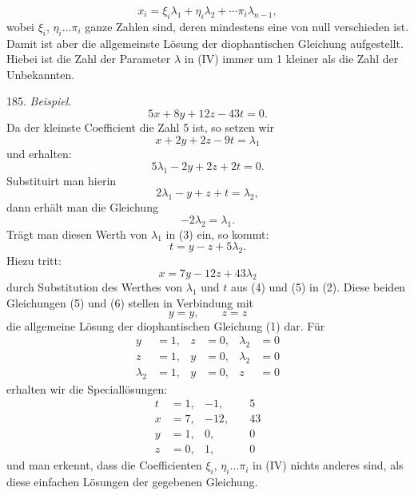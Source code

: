 \documentclass[11pt]{article}
\providecommand{\weberpage}[1]{}
\providecommand{\weq}[2]{\begin{equation}\tag{#1}#2\end{equation}}
\begin{document}
\weberpage{198}
\weq{IV}{x_i = \xi_i\lambda_1 + \eta_i\lambda_2 + \cdots \pi_i\lambda_{n-1},}
wobei $\xi_i$, $\eta_i \ldots \pi_i$ ganze Zahlen sind, deren mindestens eine von null verschieden ist. Damit ist aber die allgemeinste Lösung der diophantischen Gleichung aufgestellt. Hiebei ist die Zahl der Parameter $\lambda$ in (IV) immer um 1 kleiner als die Zahl der Unbekannten.

185. \textit{Beispiel.}
\weq{1}{5x+8y+12z-43t=0.}
Da der kleinste Coefficient die Zahl 5 ist, so setzen wir
\weq{2}{x+2y+2z-9t=\lambda_1}
und erhalten:
\[
5\lambda_1 - 2y + 2z + 2t = 0.
\]
Substituirt man hierin
\weq{3}{2\lambda_1-y+z+t=\lambda_2,}
dann erhält man die Gleichung
\weq{4}{-2\lambda_2=\lambda_1.}
Trägt man diesen Werth von $\lambda_1$ in (3) ein, so kommt:
\weq{5}{t=y-z+5\lambda_2.}
Hiezu tritt:
\weq{6}{x=7y-12z+43\lambda_2}
durch Substitution des Werthes von $\lambda_1$ und $t$ aus (4) und (5) in (2). Diese beiden Gleichungen (5) und (6) stellen in Verbindung mit
\[
y=y, \qquad z=z
\]
die allgemeine Lösung der diophantischen Gleichung (1) dar. Für
\[
\begin{aligned}
y&=1, & z&=0, & \lambda_2&=0\\
z&=1, & y&=0, & \lambda_2&=0\\
\lambda_2&=1, & y&=0, & z&=0
\end{aligned}
\]
erhalten wir die Speciallösungen:
\[
\begin{aligned}
t&=1, & -1, & \quad 5\\
x&=7, & -12, & \quad 43\\
y&=1, & 0, & \quad 0 %
\\
z&=0, & 1, & \quad 0
\end{aligned}
\]
und man erkennt, dass die Coefficienten $\xi_i$, $\eta_i \ldots \pi_i$ in (IV) nichts anderes sind, als diese einfachen Lösungen der gegebenen Gleichung.
\end{document}
